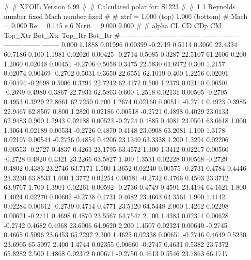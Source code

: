 #  
#       XFOIL         Version 6.99
#  
# Calculated polar for: S1223                                           
#  
# 1 1 Reynolds number fixed          Mach number fixed         
#  
# xtrf =   1.000 (top)        1.000 (bottom)  
# Mach =   0.000     Re =     0.145 e 6     Ncrit =   9.000  9.000
#  
#   alpha    CL        CD       CDp       CM     Top_Xtr  Bot_Xtr  Top_Itr  Bot_Itr
#  ------ -------- --------- --------- -------- -------- -------- -------- --------
   0.000   1.1888   0.01996   0.00399  -0.2719   0.5114   0.3060  22.4334  60.7186
   0.100   1.1981   0.02020   0.00425  -0.2714   0.5085   0.3287  22.5107  61.2606
   0.200   1.2060   0.02048   0.00451  -0.2706   0.5058   0.3475  22.5830  61.6972
   0.300   1.2157   0.02074   0.00469  -0.2702   0.5031   0.3650  22.6551  62.1019
   0.400   1.2256   0.02091   0.00494  -0.2698   0.5006   0.3791  22.7242  62.4172
   0.500   1.2379   0.02110   0.00501  -0.2699   0.4980   0.3867  22.7933  62.5863
   0.600   1.2518   0.02131   0.00505  -0.2705   0.4953   0.3929  22.8661  62.7250
   0.700   1.2674   0.02160   0.00511  -0.2714   0.4923   0.3985  22.9467  62.8507
   0.800   1.2820   0.02186   0.00518  -0.2721   0.4898   0.4029  23.0133  62.9483
   0.900   1.2943   0.02188   0.00523  -0.2724   0.4885   0.4081  23.0501  63.0618
   1.000   1.3064   0.02189   0.00534  -0.2726   0.4870   0.4148  23.0908  63.2081
   1.100   1.3178   0.02197   0.00544  -0.2726   0.4854   0.4206  23.1340  63.3338
   1.200   1.3294   0.02206   0.00553  -0.2727   0.4837   0.4263  23.1795  63.4572
   1.300   1.3412   0.02217   0.00560  -0.2728   0.4820   0.4321  23.2266  63.5827
   1.400   1.3531   0.02228   0.00568  -0.2729   0.4802   0.4383  23.2746  63.7171
   1.500   1.3652   0.02240   0.00575  -0.2731   0.4784   0.4446  23.3230  63.8533
   1.600   1.3772   0.02254   0.00581  -0.2732   0.4766   0.4503  23.3712  63.9767
   1.700   1.3901   0.02261   0.00592  -0.2736   0.4749   0.4591  23.4194  64.1621
   1.800   1.4024   0.02270   0.00602  -0.2738   0.4731   0.4682  23.4663  64.3561
   1.900   1.4142   0.02284   0.00612  -0.2739   0.4714   0.4771  23.5120  64.5448
   2.000   1.4262   0.02298   0.00621  -0.2741   0.4698   0.4870  23.5567  64.7547
   2.100   1.4383   0.02314   0.00628  -0.2742   0.4682   0.4968  23.6006  64.9620
   2.200   1.4507   0.02324   0.00640  -0.2745   0.4665   0.5096  23.6453  65.2292
   2.300   1.4625   0.02338   0.00651  -0.2746   0.4649   0.5230  23.6905  65.5097
   2.400   1.4744   0.02355   0.00660  -0.2747   0.4631   0.5382  23.7372  65.8282
   2.500   1.4868   0.02372   0.00671  -0.2750   0.4613   0.5546  23.7863  66.1717
